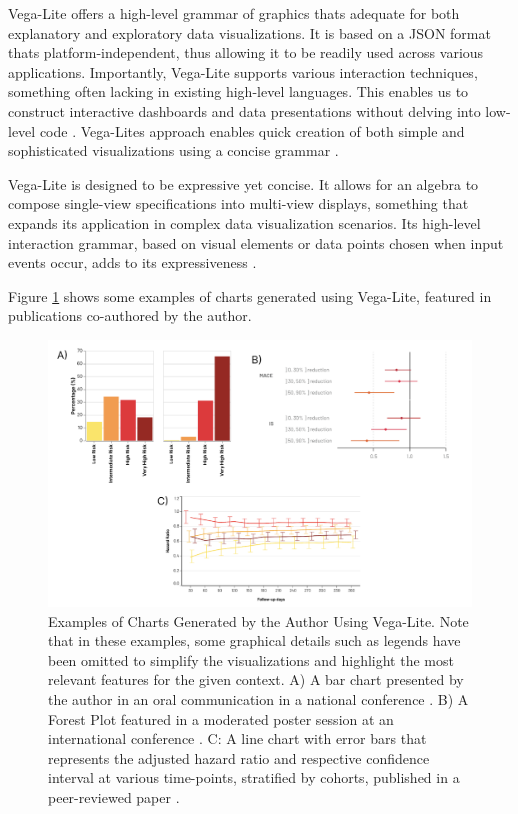 Vega-Lite offers a high-level grammar of graphics that\textquotesingle s
adequate for both explanatory and exploratory data visualizations. It is
based on a JSON format that\textquotesingle s platform-independent, thus
allowing it to be readily used across various applications. Importantly,
Vega-Lite supports various interaction techniques, something often
lacking in existing high-level languages. This enables us to construct
interactive dashboards and data presentations without delving into
low-level code \cite{14}.
Vega-Lite\textquotesingle s approach enables quick creation of both
simple and sophisticated visualizations using a concise grammar
\cite{44}.

Vega-Lite is designed to be expressive yet concise. It allows for an
algebra to compose single-view specifications into multi-view displays,
something that expands its application in complex data visualization
scenarios. Its high-level interaction grammar, based on visual elements
or data points chosen when input events occur, adds to its
expressiveness \cite{14}.

Figure \ref{fig:plots} shows some examples of charts generated using Vega-Lite, featured in publications co-authored by the author.

\begin{figure}[ht]
  \centering
  \includegraphics[width=\textwidth]{media/fig6.png}
  \caption{Examples of Charts Generated by the Author Using Vega-Lite.
  Note that in these examples, some graphical details such as legends have
  been omitted to simplify the visualizations and highlight the most
  relevant features for the given context. A) A bar chart presented by the
  author in an oral communication in a national conference
  \cite{45}. B) A Forest Plot
  featured in a moderated poster session at an international conference
  \cite{46}. C: A line chart
  with error bars that represents the adjusted hazard ratio and respective
  confidence interval at various time-points, stratified by cohorts,
  published in a peer-reviewed paper
  \cite{47}.}
  \label{fig:plots}
\end{figure}


